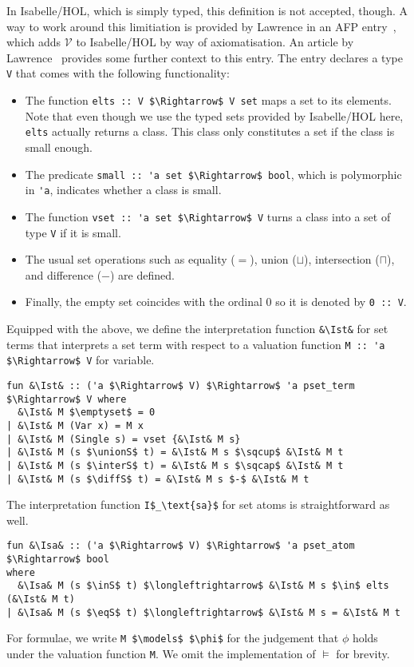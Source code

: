 \documentclass[sigplan,10pt,anonymous,review]{acmart}
\newcommand{\unionS}{\sqcup_\text{s}}
\newcommand{\interS}{\sqcap_\text{s}}
\newcommand{\diffS}{-_\text{s}}
\newcommand{\inS}{\in_\text{s}}
\newcommand{\eqS}{=_\text{s}}
\newcommand{\Ist}{I$_\text{st}$}
\newcommand{\Isa}{I$_\text{sa}$}
\begin{document}
In Isabelle/HOL, which is simply typed, this definition is not accepted, though.
A way to work around this limitiation is provided by Lawrence in an AFP entry~\cite{zfc_in_hol_afp}, which adds $\mathcal{V}$ to Isabelle/HOL by way of axiomatisation.
An article by Lawrence~\cite{zfc_in_hol} provides some further context to this entry.
The entry declares a type \lstinline!V! that comes with the following functionality:
\begin{itemize}
  \item The function \lstinline!elts :: V $\Rightarrow$ V set! maps a set to its elements.
      Note that even though we use the typed sets provided by Isabelle/HOL here, \lstinline!elts! actually returns a class.
      This class only constitutes a set if the class is small enough.
  \item The predicate \lstinline!small :: 'a set $\Rightarrow$ bool!, which is polymorphic in \lstinline!'a!, indicates whether a class is small.
  \item The function \lstinline!vset :: 'a set $\Rightarrow$ V! turns a class into a set of type \lstinline!V! if it is small. 
\item The usual set operations such as equality ($=$), union ($\sqcup$), intersection ($\sqcap$), and difference ($-$) are defined.
\item Finally, the empty set coincides with the ordinal $0$ so it is denoted by \lstinline!0 :: V!.
\end{itemize}

Equipped with the above, we define the interpretation function \lstinline!&\Ist&! for set terms that interprets a set term with respect to a valuation function \lstinline!M :: 'a $\Rightarrow$ V! for variable.
\begin{lstlisting}
fun &\Ist& :: ('a $\Rightarrow$ V) $\Rightarrow$ 'a pset_term $\Rightarrow$ V where
  &\Ist& M $\emptyset$ = 0
| &\Ist& M (Var x) = M x
| &\Ist& M (Single s) = vset {&\Ist& M s}
| &\Ist& M (s $\unionS$ t) = &\Ist& M s $\sqcup$ &\Ist& M t 
| &\Ist& M (s $\interS$ t) = &\Ist& M s $\sqcap$ &\Ist& M t 
| &\Ist& M (s $\diffS$ t) = &\Ist& M s $-$ &\Ist& M t 
\end{lstlisting}
The interpretation function \lstinline!I$_\text{sa}$! for set atoms is straightforward as well.
\begin{lstlisting}
fun &\Isa& :: ('a $\Rightarrow$ V) $\Rightarrow$ 'a pset_atom $\Rightarrow$ bool
where
  &\Isa& M (s $\inS$ t) $\longleftrightarrow$ &\Ist& M s $\in$ elts (&\Ist& M t)
| &\Isa& M (s $\eqS$ t) $\longleftrightarrow$ &\Ist& M s = &\Ist& M t
\end{lstlisting}
For formulae, we write \lstinline!M $\models$ $\phi$! for the judgement that $\phi$ holds under the valuation function \lstinline!M!.
We omit the implementation of $\models$ for brevity.
\end{document}
